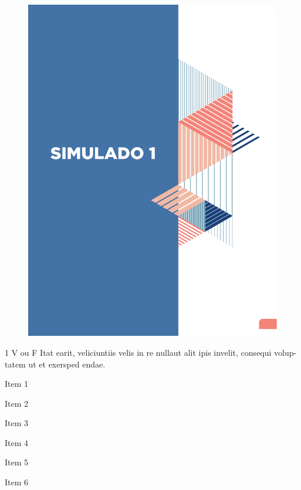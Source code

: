 \begin{figure}[htpb!]
\vspace*{-3cm}
\hspace*{-3.5cm}\includegraphics[scale=1]{./simulado.pdf}
\end{figure}

\pagebreak
{}

\num{1} V ou F Itat earit, veliciuntiis velis in re nullaut alit ipis invelit, consequi volup-
tatem ut et exersped endae.\\

\begin{boxlist}
    \item Item 1

    \item Item 2

    \item Item 3

    \item Item 4

    \item Item 5

    \item Item 6
\end{boxlist}



